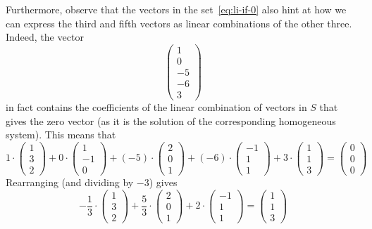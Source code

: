 Furthermore, observe that the vectors in the set~\eqref{eq:li-if-0} also hint at
how we can express the third and fifth vectors as linear combinations of the
other three. Indeed, the vector
\[
 \begin{pmatrix}
  1\\
  0\\
  -5\\
  -6\\
  3
 \end{pmatrix}
\]
in fact contains the coefficients of the linear combination of vectors in $S$
that gives the zero vector (as it is the solution of the corresponding
homogeneous system). This means that
\[
 1 \cdot
 \begin{pmatrix}
  1\\
  3\\
  2
 \end{pmatrix}
 + 0 \cdot 
 \begin{pmatrix}
  1\\
  -1\\
  0
 \end{pmatrix}
 + (-5) \cdot 
 \begin{pmatrix}
  2\\
  0\\
  1
 \end{pmatrix}
 + (-6) \cdot 
 \begin{pmatrix}
  -1\\
  1\\
  1
 \end{pmatrix}
 + 3 \cdot 
 \begin{pmatrix}
  1\\
  1\\
  3
 \end{pmatrix}
 =
 \begin{pmatrix}
  0\\
  0\\
  0
 \end{pmatrix}
\]
Rearranging (and dividing by $-3$) gives
\[
 -\frac{1}{3} \cdot 
 \begin{pmatrix}
  1\\
  3\\
  2
 \end{pmatrix}
 + \frac{5}{3} \cdot 
 \begin{pmatrix}
  2\\
  0\\
  1
 \end{pmatrix}
 + 2 \cdot 
 \begin{pmatrix}
  -1\\
  1\\
  1
 \end{pmatrix}
 = 
 \begin{pmatrix}
  1\\
  1\\
  3
 \end{pmatrix}
\]
